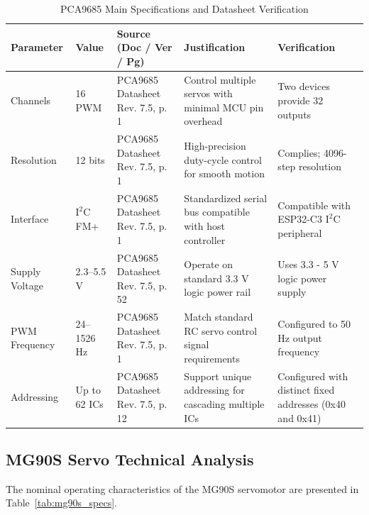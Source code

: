 \documentclass[lettersize,journal]{IEEEtran}
\begin{document}
	\begin{table}[!t]
		\centering
		\caption{PCA9685 Main Specifications and Datasheet Verification \cite{pca9685}}
		\label{tab:pca9685_specs}
		\scriptsize
		
		\setlength{\tabcolsep}{2pt}
		\renewcommand{\arraystretch}{1.1}
		
		\begin{tabularx}{\columnwidth}{@{}P{1.5cm} P{1.4cm} P{2.2cm} X X@{}}
			\toprule
			\textbf{Parameter} & \textbf{Value} & \textbf{Source (Doc / Ver / Pg)} & \textbf{Justification} & \textbf{Verification} \\
			\midrule
			
			Channels & 
			16 PWM & 
			PCA9685 Datasheet Rev. 7.5, p. 1 & 
			Control multiple servos with minimal MCU pin overhead & 
			Two devices provide 32 outputs \\
			
			Resolution & 
			12 bits & 
			PCA9685 Datasheet Rev. 7.5, p. 1 & 
			High-precision duty-cycle control for smooth motion & 
			Complies; 4096-step resolution \\
			
			Interface & 
			$\text{I}^2\text{C}$ FM+ & 
			PCA9685 Datasheet Rev. 7.5, p. 1 & 
			Standardized serial bus compatible with host controller & 
			Compatible with ESP32-C3 $\text{I}^2\text{C}$ peripheral \\
			
			Supply Voltage & 
			2.3--5.5 V & 
			PCA9685 Datasheet Rev. 7.5, p. 52 & 
			Operate on standard 3.3 V logic power rail & 
			Uses 3.3 - 5 V logic power supply \\
			
			PWM Frequency & 
			24--1526 Hz & 
			PCA9685 Datasheet Rev. 7.5, p. 1 & 
			Match standard RC servo control signal requirements & 
			Configured to 50 Hz output frequency \\
			
			Addressing & 
			Up to 62 ICs & 
			PCA9685 Datasheet Rev. 7.5, p. 12 & 
			Support unique addressing for cascading multiple ICs & 
			Configured with distinct fixed addresses (0x40 and 0x41) \\
			
			\bottomrule
		\end{tabularx}
	\end{table}
	
	
	
	\subsection{MG90S Servo Technical Analysis}
	The nominal operating characteristics of the MG90S servomotor are presented in Table~\ref{tab:mg90s_specs}.
	
\end{document}
